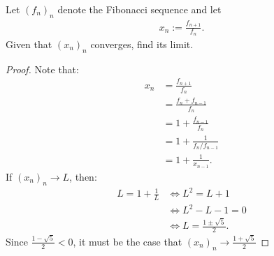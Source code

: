 \documentclass[10pt,twoside,openany]{memoir}
\begin{document}
    \begin{exercise}
        Let $(f_n)_n$ denote the Fibonacci sequence and let
            \begin{equation*}
            \begin{split}
                x_n := \frac{f_{n+1}}{f_n}.
            \end{split}
            \end{equation*}
        Given that $(x_n)_n$ converges, find its limit.
    \end{exercise}
        \begin{proof}
            Note that:
                \begin{equation*}
                \begin{split}
                    x_n 
                    &= \frac{f_{n+1}}{f_n} \\
                    &= \frac{f_{n} + f_{n-1}}{f_n} \\
                    &= 1 + \frac{f_{n-1}}{f_n} \\
                    & = 1 + \frac{1}{{f_n}/f_{n-1}} \\
                    & = 1 + \frac{1}{x_{n-1}}.
                \end{split}
                \end{equation*}
            If $(x_n)_n \rightarrow L$, then:
                \begin{equation*}
                \begin{split}
                    L = 1 + \frac{1}{L}
                    &\iff L^2 = L + 1 \\
                    &\iff L^2 - L - 1 = 0 \\
                    &\iff L = \frac{1 \pm \sqrt{5}}{2}.
                \end{split}
                \end{equation*}
            Since $\frac{1 - \sqrt{5}}{2} < 0$, it must be the case that $(x_n)_n \rightarrow \frac{1 + \sqrt{5}}{2}$
        \end{proof}
\end{document}

